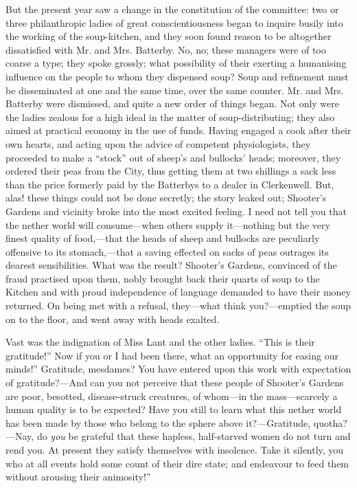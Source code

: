 But the present year saw a change in the constitution of the committee:
two or three philanthropic ladies of great conscientiousness began to
inquire busily into the working of the soup-kitchen, and they soon found
reason to be altogether dissatisfied with Mr. and Mrs. Batterby. No, no;
these managers were of too coarse a type; they spoke grossly; what
possibility of their exerting a humanising
{\protect\hypertarget{10}{}{}}influence on the people to whom they
dispensed soup? Soup and refinement must be disseminated at one and the
same time, over the same counter. Mr. and Mrs. Batterby were dismissed,
and quite a new order of things began. Not only were the ladies zealous
for a high ideal in the matter of soup-distributing; they also aimed at
practical economy in the use of funds. Having engaged a cook after their
own hearts, and acting upon the advice of competent physiologists, they
proceeded to make a ``stock'' out of sheep's and bullocks' heads;
moreover, they ordered their peas from the City, thus getting them at
two shillings a sack less than the price formerly paid by the Batterbys
to a dealer in Clerkenwell. But, alas! these things could not be done
secretly; the story leaked out; Shooter's Gardens and vicinity broke
into the most excited feeling. I need not tell you that the nether world
will consume---when others supply it---nothing but the very finest
quality of food,---that the heads of sheep and bullocks are peculiarly
offensive to its stomach,---that a saving effected on sacks of peas
outrages its dearest sensibilities. What was the result? Shooter's
Gardens, convinced {\protect\hypertarget{11}{}{}}of the fraud practised
upon them, nobly brought back their quarts of soup to the Kitchen and
with proud independence of language demanded to have their money
returned. On being met with a refusal, they---what think you?---emptied
the soup on to the floor, and went away with heads exalted.

Vast was the indignation of Miss Lant and the other ladies. ``This is
their gratitude!'' Now if you or I had been there, what an opportunity
for easing our minds!'' Gratitude, mesdames? You have entered upon this
work with expectation of gratitude?---And can you not perceive that
these people of Shooter's Gardens are poor, besotted, disease-struck
creatures, of whom---in the mass---scarcely a human quality is to be
expected? Have you still to learn what this nether world has been made
by those who belong to the sphere above it?---Gratitude, quotha?---Nay,
do \emph{you} be grateful that these hapless, half-starved women do not
turn and rend you. At present they satisfy themselves with insolence.
Take it silently, you who at all events hold some count of their dire
state; and endeavour to feed them without arousing their animosity!''

